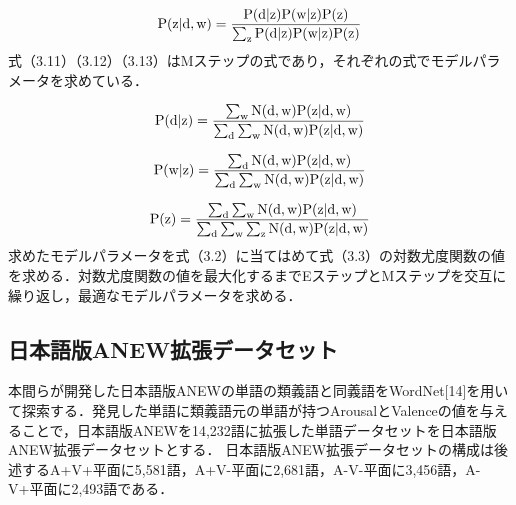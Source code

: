 \begin{equation}
\rm{P(z|d,w)=\frac{P(d|z)P(w|z)P(z)}{\sum_zP(d|z)P(w|z)P(z)}}
\end{equation}
式（3.11）（3.12）（3.13）はMステップの式であり，それぞれの式でモデルパラメータを求めている．

\begin{equation}
\rm{P(d|z)=\frac{\sum_wN(d,w)P(z|d,w)}{\sum_d\sum_wN(d,w)P(z|d,w)}}
\end{equation}

\begin{equation}
\rm{P(w|z)=\frac{\sum_dN(d,w)P(z|d,w)}{\sum_d\sum_wN(d,w)P(z|d,w)}}
\end{equation}

\begin{equation}
\rm{P(z)=\frac{\sum_d\sum_wN(d,w)P(z|d,w)}{\sum_d\sum_w\sum_zN(d,w)P(z|d,w)}}
\end{equation}
求めたモデルパラメータを式（3.2）に当てはめて式（3.3）の対数尤度関数の値を求める．対数尤度関数の値を最大化するまでEステップとMステップを交互に繰り返し，最適なモデルパラメータを求める．

\subsection{日本語版ANEW拡張データセット}
本間らが開発した日本語版ANEWの単語の類義語と同義語をWordNet[14]を用いて探索する．発見した単語に類義語元の単語が持つArousalとValenceの値を与えることで，日本語版ANEWを14,232語に拡張した単語データセットを日本語版ANEW拡張データセットとする．
日本語版ANEW拡張データセットの構成は後述するA+V+平面に5,581語，A+V-平面に2,681語，A-V-平面に3,456語，A-V+平面に2,493語である．
\newpage